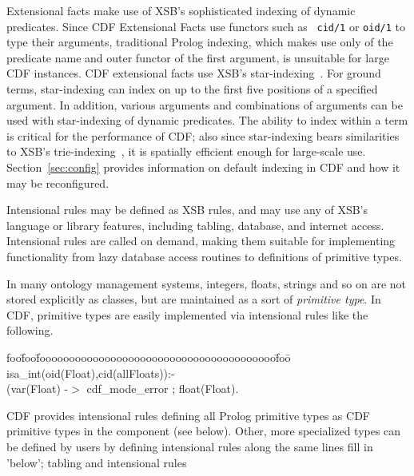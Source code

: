 Extensional facts make use of XSB's sophisticated indexing of dynamic
predicates.  Since CDF Extensional Facts use functors such as {\tt
cid/1} or {\tt oid/1} to type their arguments, traditional Prolog
indexing, which makes use only of the predicate name and outer functor
of the first argument, is unsuitable for large CDF instances.  CDF
extensional facts use XSB's star-indexing~\cite{XSB-home}.  For ground
terms, star-indexing can index on up to the first five positions of a
specified argument.  In addition, various arguments and combinations
of arguments can be used with star-indexing of dynamic predicates.
The ability to index within a term is critical for the performance of
CDF; also since star-indexing bears similarities to XSB's
trie-indexing~\cite{RRSSW98}, it is spatially efficient enough for
large-scale use.  Section~\ref{sec:config} provides information on
default indexing in CDF and how it may be reconfigured.

Intensional rules may be defined as XSB rules, and may use any of
XSB's language or library features, including tabling, database, and
internet access.  Intensional rules are called on demand, making them
suitable for implementing functionality from lazy database access
routines to definitions of primitive types.

\begin{example} \rm \label{ex:intrules}
In many ontology management systems, integers, floats, strings and so
on are not stored explicitly as classes, but are maintained as a sort
of {\em primitive type}.  In CDF, primitive types are easily
implemented via intensional rules like the following.
%
{\small {\sf  
\begin{tabbing}
foo\=foo\=foooooooooooooooooooooooooooooooooooooooo\=foo\=\kill
%
\> isa\_int(oid(Float),cid(allFloats)):- \\
\> \> 	(var(Float) -$>$ cdf\_mode\_error ; float(Float). \\
\end{tabbing} } }
\end{example}
%
CDF provides intensional rules defining all Prolog primitive types as
CDF primitive types in the component  (see below).
Other, more specialized types can be defined by users by defining
intensional rules along the same lines {\sc fill in 'below'; tabling
and intensional rules}

